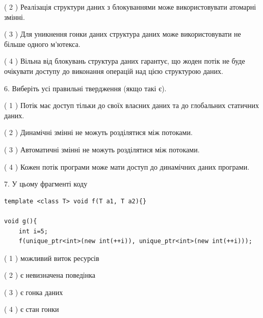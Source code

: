 \documentclass[12pt, ukrainian]{article}
\begin{document}
\begin {large}
{( 2 ) Реалізація структури даних з блокуваннями може використовувати атомарні змінні.%

( 3 ) Для уникнення гонки даних структура даних може використовувати не більше одного м’ютекса.%

( 4 ) Вільна від блокувань структура даних гарантує, що жоден потік не буде очікувати доступу до виконання операцій над цією структурою даних.%
\newpage



\vspace{5mm}
6. Виберіть усі правильні твердження (якщо такі є).\par
\vspace{2mm}

( 1 ) Потік має доступ тільки до своїх власних даних та до глобальних статичних даних.%

( 2 ) Динамічні змінні не можуть розділятися між потоками.%

( 3 ) Автоматичні змінні не можуть розділятися між потоками.%

( 4 ) Кожен потік програми може мати доступ до динамічних даних програми.%


\vspace{5mm}
7. У цьому фрагменті коду
\begin{verbatim}
template <class T> void f(T a1, T a2){}

void g(){
    int i=5;
    f(unique_ptr<int>(new int(++i)), unique_ptr<int>(new int(++i)));
\end{verbatim}

( 1 ) можливий виток ресурсів%

( 2 ) є невизначена поведінка%

( 3 ) є гонка даних%

( 4 ) є стан гонки%
}
\end {large}
\end{document}
